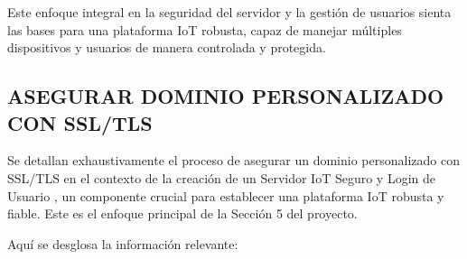 \documentclass{report}
\begin{document}
Este enfoque integral en la seguridad del servidor y la gestión de usuarios sienta las bases para una plataforma IoT robusta, capaz de manejar 
múltiples dispositivos y usuarios de manera controlada y protegida.

\subsection{ASEGURAR DOMINIO PERSONALIZADO CON SSL/TLS}
Se detallan exhaustivamente el proceso de  asegurar un dominio personalizado con SSL/TLS  en el contexto de la creación de un  Servidor IoT 
Seguro y Login de Usuario , un componente crucial para establecer una plataforma IoT robusta y fiable. Este es el enfoque principal de la Sección 5 
del proyecto.

Aquí se desglosa la información relevante:
\end{document}
